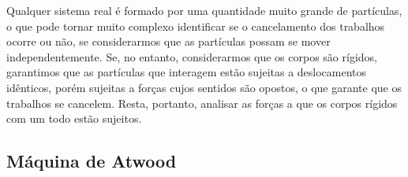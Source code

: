 Qualquer sistema real é formado por uma quantidade muito grande de partículas, o que pode tornar muito complexo identificar se o cancelamento dos trabalhos ocorre ou não, se considerarmos que as partículas possam se mover independentemente. Se, no entanto, considerarmos que os corpos são rígidos, garantimos que as partículas que interagem estão sujeitas a deslocamentos idênticos, porém sujeitas a forças cujos sentidos são opostos, o que garante que os trabalhos se cancelem. Resta, portanto, analisar as forças a que os corpos rígidos com um todo estão sujeitos.

\subsection{Máquina de Atwood}

